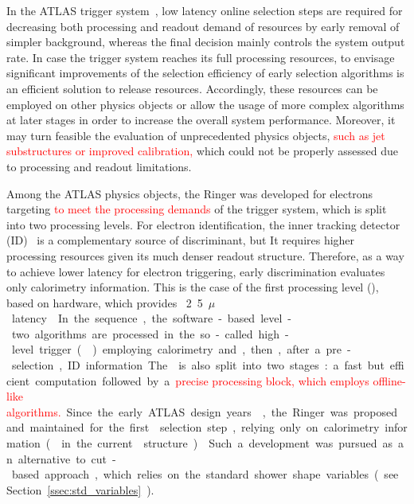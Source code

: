 In the ATLAS trigger system~\cite{TRIG-2016-01}, low latency online selection
steps are required for decreasing both processing and readout demand of
resources by early removal of simpler background, whereas the final decision
mainly controls the system output rate. In case the trigger system reaches its
full processing resources, to envisage significant improvements of the selection
efficiency of early selection algorithms is an efficient solution to release
resources. Accordingly, these resources can be employed on other physics
objects or allow the usage of more complex algorithms at later stages in order
to increase the overall system performance. Moreover, it may turn feasible the
evaluation of unprecedented physics objects, \textcolor{red}{such as jet substructures or improved calibration,} which could not be properly
assessed due to processing and readout limitations.


Among the ATLAS physics objects, the Ringer was developed for electrons targeting \textcolor{red}{to meet the processing demands} of the trigger system, which is split into two processing levels.  For electron identification, the inner tracking detector (ID)~\cite{PERF-2007-01} is a complementary source of discriminant, but It requires higher processing resources given its much denser readout structure.  Therefore, as a way to achieve lower latency for electron triggering, early discrimination evaluates only calorimetry information. This is the case of the first processing level (\licalo), based on hardware, which provides \SI{}2.5{$\mu$} latency~\cite{TRIG-2016-01}. In the sequence, the software-based level-two algorithms are processed in the so-called high-level trigger (\hlt{}) employing calorimetry and, then, after a pre-selection, ID information.  The \hlt{} is also split into two stages: a fast but efficient computation followed by a \textcolor{red}{precise processing block, which employs offline-like algorithms.} Since the early ATLAS design years~\cite{1995_seixas_ringer}, the Ringer was proposed and maintained for the first \hlt{} selection step, relying only on calorimetry information (\fastcalo{} in the current \hlt{} structure)~\cite{TRIG-2016-01}.  Such a development was pursued as an alternative to cut-based approach, which relies on the standard shower shape variables (see Section~\ref{ssec:std_variables}).

